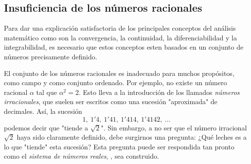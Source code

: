 \subsection{Insuficiencia de los números racionales}
Para dar una explicación satisfactoria de los principales conceptos del análisis matemático como son la convergencia, la continuidad, la diferenciabilidad y la integrabilidad, es necesario que estos conceptos esten basados en un conjunto de números precisamente definido.

El conjunto de los números racionales es inadecuado para muchos propósitos, como campo y como conjunto ordenado. Por ejemplo, no existe un número racional $\alpha$ tal que $\alpha^2 = 2$. Esto lleva a la introducción de los llamados \textit{números irracionales}, que suelen ser escritos como una sucesión "aproximada" de decimales. Así, la sucesión
\begin{equation}
    1,\ 1'4,\ 1'41,\ 1'414,\ 1'4142,\ \ldots
\end{equation}
podemos decir que "tiende a $\sqrt{2}$". Sin embargo, a no ser que el número irracional $\sqrt{2}$ haya sido claramente definido, debe surgirnos una pregunta: ¿Qué leches es a lo que "tiende" esta sucesión? Esta pregunta puede ser respondida tan pronto como el \textit{sistema de números reales}, \R,  sea construido.

